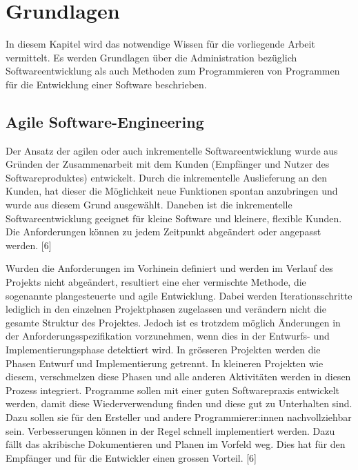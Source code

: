 
\section{Grundlagen}
In diesem Kapitel wird das notwendige Wissen für die vorliegende Arbeit vermittelt. Es werden Grundlagen über die Administration bezüglich Softwareentwicklung als auch Methoden zum Programmieren von Programmen für die Entwicklung einer Software beschrieben.\\

\subsection{Agile Software-Engineering}
Der Ansatz der agilen oder auch inkrementelle Softwareentwicklung wurde aus Gründen der Zusammenarbeit mit dem Kunden (Empfänger und Nutzer des Softwareproduktes) entwickelt. Durch die inkrementelle Auslieferung an den Kunden, hat dieser die Möglichkeit neue Funktionen spontan anzubringen und wurde aus diesem Grund ausgewählt. Daneben ist die inkrementelle Softwareentwicklung geeignet für kleine Software und kleinere, flexible Kunden. Die Anforderungen können zu jedem Zeitpunkt abgeändert oder angepasst werden. [6]

Wurden die Anforderungen im Vorhinein definiert und werden im Verlauf des Projekts nicht abgeändert, resultiert eine eher vermischte Methode, die sogenannte plangesteuerte und agile Entwicklung. Dabei werden Iterationsschritte lediglich in den einzelnen Projektphasen zugelassen und verändern nicht die gesamte Struktur des Projektes. Jedoch ist es trotzdem möglich Änderungen in der Anforderungsspezifikation vorzunehmen, wenn dies in der Entwurfs- und Implementierungsphase detektiert wird. In grösseren Projekten werden die Phasen Entwurf und Implementierung getrennt. In kleineren Projekten wie diesem, verschmelzen diese Phasen und alle anderen Aktivitäten werden in diesen Prozess integriert. Programme sollen mit einer guten Softwarepraxis entwickelt werden, damit diese Wiederverwendung finden und diese gut zu Unterhalten sind. Dazu sollen sie für den Ersteller und andere Programmierer:innen nachvollziehbar sein.
Verbesserungen können in der Regel schnell implementiert werden. Dazu fällt das akribische Dokumentieren und Planen im Vorfeld weg. Dies hat für den Empfänger und für die Entwickler einen grossen Vorteil. [6] %

